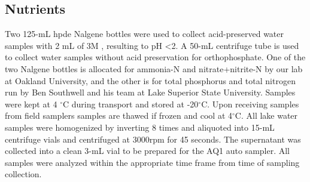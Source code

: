 \subsection{Nutrients}

Two 125-mL \gls{hpde} Nalgene bottles were used to collect acid-preserved water samples with 2 mL of 3M , resulting to pH \textless 2. A 50-mL centrifuge tube is used to collect water samples without acid preservation for orthophosphate. One of the two Nalgene bottles is allocated for ammonia-N and nitrate+nitrite-N by our lab at Oakland University, and the other is for total phosphorus and total nitrogen run by Ben Southwell and his team at Lake Superior State University.  Samples were kept  at 4 $^\circ$C during transport and stored at -20$^\circ$C. Upon receiving samples from field samplers samples are thawed if frozen and cool at 4$^\circ$C. All lake water samples were homogenized by inverting 8 times and aliquoted into 15-mL centrifuge vials and centrifuged at 3000rpm for 45 seconds. The supernatant was collected into a clean 3-mL vial to be prepared for the AQ1 auto sampler. All samples were analyzed within the appropriate time frame from time of sampling collection.

